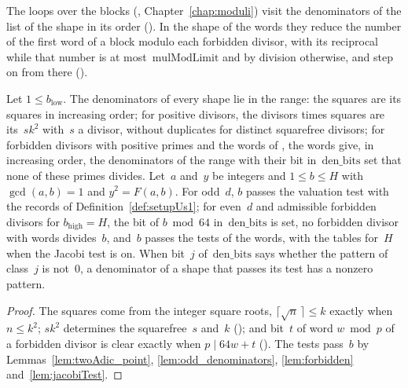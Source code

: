 The loops over the blocks (, Chapter~\ref{chap:moduli})
visit the denominators of the list of the shape in its order
(). In the shape of the words they reduce the number
of the first word of a block modulo each forbidden divisor, with its reciprocal while that number is
at most~$\mathrm{mulModLimit}$ and by division otherwise, and step on from there
().

\begin{lemma}\label{lem:shapes}
  \leanok
  Let $1 \le b_{\mathrm{low}}$. The denominators of every shape lie in the range: the squares are
  its squares in increasing order; for positive divisors, the divisors times squares are its~$s k^2$
  with~$s$ a divisor, without duplicates for distinct squarefree divisors; for forbidden divisors
  with positive primes and the words of , the words give, in
  increasing order, the denominators of the range with their bit in~$\mathrm{den\_bits}$ set that
  none of these primes divides. Let~$a$ and~$y$ be integers and $1 \le b \le H$ with
  $\gcd(a, b) = 1$ and $y^2 = F(a, b)$. For odd~$d$, $b$ passes the valuation test with the records
  of Definition~\ref{def:setupUs1}; for even~$d$ and admissible forbidden divisors for
  $b_{\mathrm{high}} = H$, the bit of $b \bmod 64$ in~$\mathrm{den\_bits}$ is set, no forbidden
  divisor with words divides~$b$, and~$b$ passes the tests of the words, with the tables for~$H$
  when the Jacobi test is on. When bit~$j$ of~$\mathrm{den\_bits}$ says whether the pattern of
  class~$j$ is not~$0$, a denominator of a shape that passes its test has a nonzero pattern.
\end{lemma}

\begin{proof}
  \leanok
  The squares come from the integer square roots, $\lceil \sqrt{n}\, \rceil \le k$ exactly when
  $n \le k^2$; $s k^2$ determines the squarefree~$s$ and~$k$
  (); and bit~$t$ of word $w \bmod p$ of a forbidden divisor
  is clear exactly when $p \mid 64 w + t$
  (). The tests pass~$b$ by
  Lemmas~\ref{lem:twoAdic_point}, \ref{lem:odd_denominators}, \ref{lem:forbidden}
  and~\ref{lem:jacobiTest}.
\end{proof}

